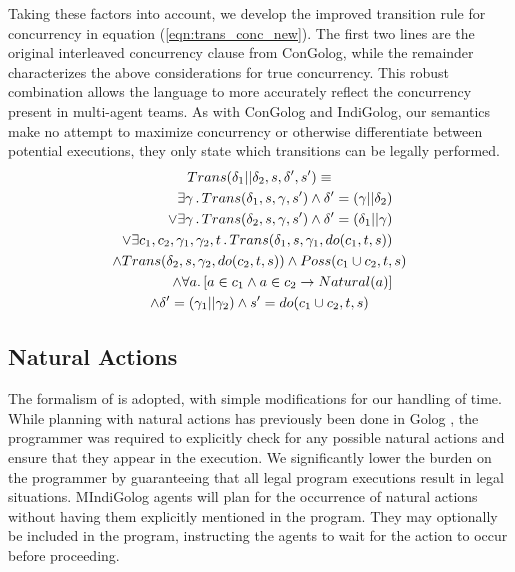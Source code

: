 Taking these factors into account, we develop the improved transition
rule for concurrency in equation (\ref{eqn:trans_conc_new}). The
first two lines are the original interleaved concurrency clause from
ConGolog, while the remainder characterizes the above considerations
for true concurrency. This robust combination allows the language
to more accurately reflect the concurrency present in multi-agent
teams. As with ConGolog and IndiGolog, our semantics make no attempt
to maximize concurrency or otherwise differentiate between potential
executions, they only state which transitions can be legally performed.\begin{multline}
Trans(\delta_{1}||\delta_{2},s,\delta',s')\equiv\\
\shoveright{\exists\gamma\,.\, Trans(\delta_{1},s,\gamma,s')\wedge\delta'=(\gamma||\delta_{2})}\\
\shoveright{\vee\exists\gamma\,.\, Trans(\delta_{2},s,\gamma,s')\wedge\delta'=(\delta_{1}||\gamma)}\\
\shoveright{\vee\exists c_{1},c_{2},\gamma_{1},\gamma_{2},t\,.\, Trans(\delta_{1},s,\gamma_{1},do(c_{1},t,s))}\\
\wedge Trans(\delta_{2},s,\gamma_{2},do(c_{2},t,s))\wedge Poss(c_{1}\cup c_{2},t,s)\\
\shoveright{\wedge\forall a.\left[a\in c_{1}\wedge a\in c_{2}\rightarrow Natural(a)\right]}\\
\wedge\delta'=(\gamma_{1}||\gamma_{2})\wedge s'=do(c_{1}\cup c_{2},t,s)\label{eqn:trans_conc_new}\end{multline}



\subsection{Natural Actions}

The formalism of \cite{reiter96sc_nat_conc} is adopted, with simple
modifications for our handling of time. While planning with natural
actions has previously been done in Golog \cite{pirri00planning_nat_acts},
the programmer was required to explicitly check for any possible natural
actions and ensure that they appear in the execution. We significantly
lower the burden on the programmer by guaranteeing that all legal
program executions result in legal situations. MIndiGolog agents will
plan for the occurrence of natural actions without having them explicitly
mentioned in the program. They may optionally be included in the program,
instructing the agents to wait for the action to occur before proceeding.

